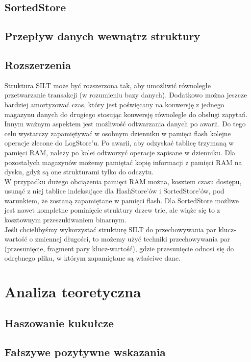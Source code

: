 \documentclass[declaration,shortabstract,masc]{iithesis}
\begin{document}
		\section{SortedStore}
		\section{Przepływ danych wewnątrz struktury}
		\section{Rozszerzenia}
			Struktura SILT może być rozszerzona tak, aby umożliwić równoległe przetwarzanie transakcji (w rozumieniu bazy danych). Dodatkowo można jeszcze bardziej amortyzować czas, który jest poświęcany na konwersję z jednego magazynu danych do drugiego stosując konwersję równolegle do obsługi zapytań.\\
			\indent Innym ważnym aspektem jest możliwość odtwarzania danych po awarii. Do tego celu wystarczy zapamiętywać w osobnym dzienniku w pamięci flash kolejne operacje zlecone do LogStore'u. Po awarii, aby odzyskać tablicę trzymaną w pamięci RAM, należy po kolei odtworzyć operacje zapisane w dzienniku. Dla pozostałych magazynów możemy pamiętać kopię informacji z pamięci RAM na dysku, gdyż są one strukturami tylko do odczytu.\\
			\indent W przypadku dużego obciążenia pamięci RAM można, kosztem czasu dostępu, usunąć z niej tablice indeksujące dla HashStore'ów i SortedStore'ów, pod warunkiem, że zostaną zapamiętane w pamięci flash. Dla SortedStore możliwe jest nawet kompletne pominięcie struktury drzew trie, ale wiąże się to z kosztownym przeszukiwaniem binarnym.\\
			\indent Jeśli chcielibyśmy wykorzystać strukturę SILT do przechowywania par klucz-wartość o zmiennej długości, to możemy użyć techniki przechowywania par (przesunięcie, fragment pary klucz-wartość), gdzie przesunięcie odnosi się do odrębnego pliku, w którym zapamiętane są właściwe dane.
	\chapter{Analiza teoretyczna}
		\section{Haszowanie kukułcze}
		\section{Fałszywe pozytywne wskazania}
\end{document}
